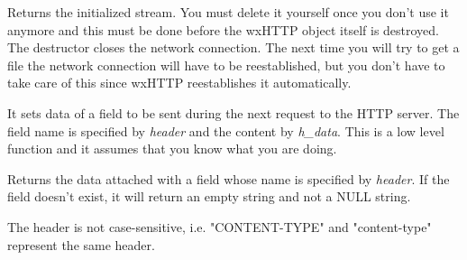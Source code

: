 Returns the initialized stream. You must delete it yourself once you
don't use it anymore and this must be done before the wxHTTP object itself is
destroyed. The destructor closes the network connection. The next time you will
try to get a file the network connection will have to be reestablished, but you
don't have to take care of this since wxHTTP reestablishes it automatically.




\label{wxhttpsetheader}


It sets data of a field to be sent during the next request to the HTTP server. The field
name is specified by {\it header} and the content by {\it h\_data}.
This is a low level function and it assumes that you know what you are doing.

\label{wxhttpgetheader}


Returns the data attached with a field whose name is specified by {\it header}.
If the field doesn't exist, it will return an empty string and not a NULL string.


The header is not case-sensitive, i.e. "CONTENT-TYPE" and "content-type" 
represent the same header.


